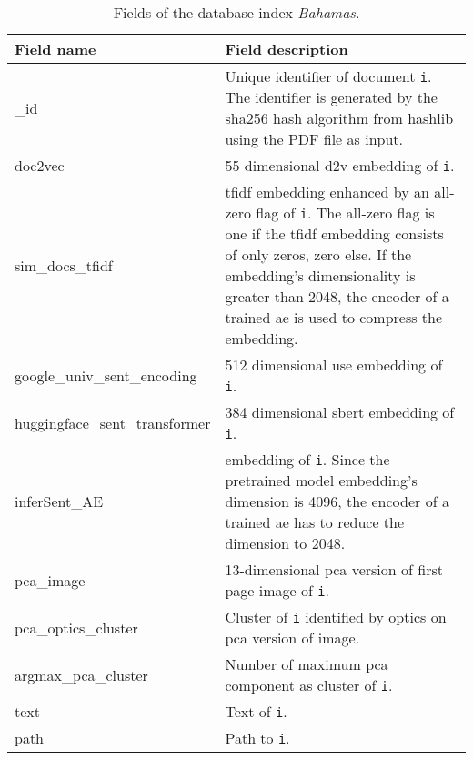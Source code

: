 \begin{table}[]
    \caption{Fields of the \databaseName{} database index \textit{Bahamas}.}
    \begin{tabular}{|
    >{\columncolor[HTML]{EFEFEF}}l |p{}|}
    \hline
    \cellcolor[HTML]{C0C0C0}\textbf{Field name} & \cellcolor[HTML]{C0C0C0}\textbf{Field description}                                     \\ \hline
    \_id                                        & Unique identifier of document \texttt{i}. The identifier is generated by the sha256 hash algorithm from hashlib using the PDF file as input.\\ \hline
    doc2vec                                     & 55 dimensional \ac{d2v} embedding of \texttt{i}.                                                          \\ \hline
    sim\_docs\_tfidf                            & \ac{tfidf} embedding enhanced by an all-zero flag of \texttt{i}. The all-zero flag is one if the \ac{tfidf} embedding consists of only zeros, zero else. If the embedding's dimensionality is greater than 2048, the encoder of a trained \ac{ae} is used to compress the embedding.\\ \hline
    google\_univ\_sent\_encoding                & 512 dimensional \ac{use} embedding of \texttt{i}.                                     \\ \hline
    huggingface\_sent\_transformer              & 384 dimensional \ac{sbert} embedding of \texttt{i}.                                  \\ \hline
    inferSent\_AE                               & \infersent{} embedding of \texttt{i}. Since the pretrained \infersent{} model embedding's dimension is 4096, the encoder of a trained \ac{ae} has to reduce the dimension to 2048.                                                    \\ \hline
    pca\_image                                  & 13-dimensional \ac{pca} version of first page image of \texttt{i}.                      \\ \hline
    pca\_optics\_cluster                        & Cluster of \texttt{i} identified by \acs{optics} on \ac{pca} version of image.            \\ \hline
    argmax\_pca\_cluster                        & Number of maximum \ac{pca} component as cluster of \texttt{i}.                            \\ \hline
    text                                        & Text of \texttt{i}.                                                                       \\ \hline
    path                                        & Path to \texttt{i}.                                                     \\ \hline
    \end{tabular}
    \label{tbl:Elasticsearch-fields}
\end{table}

